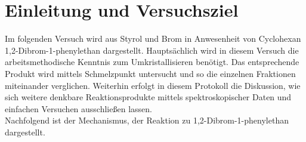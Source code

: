 \section{Einleitung und Versuchsziel}
\label{sec:aufgabenstellung}

Im folgenden Versuch wird aus Styrol und Brom in Anwesenheit von Cyclohexan 1,2-Dibrom-1-phenylethan dargestellt. Hauptsächlich wird in diesem Versuch die arbeitsmethodische Kenntnis zum Umkristallisieren benötigt. Das entsprechende Produkt wird mittels Schmelzpunkt untersucht und so die einzelnen Fraktionen miteinander verglichen. Weiterhin erfolgt in diesem Protokoll die Diskussion, wie sich weitere denkbare Reaktionsprodukte mittels spektroskopischer Daten und einfachen Versuchen ausschließen lassen.\\
Nachfolgend ist der Mechanismus, der Reaktion zu 1,2-Dibrom-1-phenylethan dargestellt.

